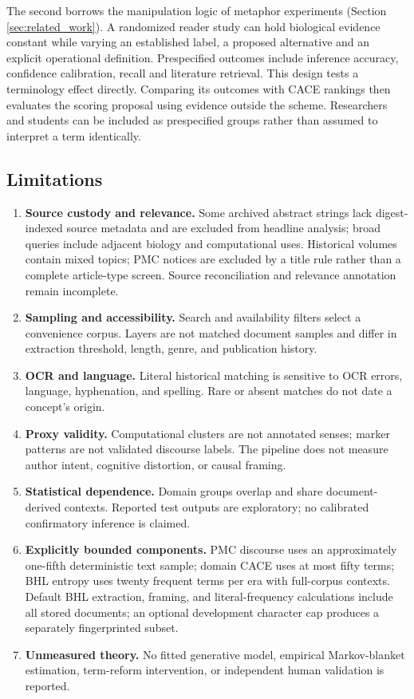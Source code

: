 \documentclass[
]{article}
\providecommand{\tightlist}{%
  \setlength{\itemsep}{0pt}\setlength{\parskip}{0pt}}
\numberwithin{equation}{section}
\begin{document}
The second borrows the manipulation logic of metaphor experiments
(Section \ref{sec:related_work}). A randomized reader study can hold
biological evidence constant while varying an established label, a
proposed alternative and an explicit operational definition.
Prespecified outcomes include inference accuracy, confidence
calibration, recall and literature retrieval. This design tests a
terminology effect directly. Comparing its outcomes with CACE rankings
then evaluates the scoring proposal using evidence outside the scheme.
Researchers and students can be included as prespecified groups rather
than assumed to interpret a term identically.

\subsection{Limitations}\label{limitations}

\begin{enumerate}
\def\labelenumi{\arabic{enumi}.}
\tightlist
\item
  \textbf{Source custody and relevance.} Some archived abstract strings
  lack digest-indexed source metadata and are excluded from headline
  analysis; broad queries include adjacent biology and computational
  uses. Historical volumes contain mixed topics; PMC notices are
  excluded by a title rule rather than a complete article-type screen.
  Source reconciliation and relevance annotation remain incomplete.
\item
  \textbf{Sampling and accessibility.} Search and availability filters
  select a convenience corpus. Layers are not matched document samples
  and differ in extraction threshold, length, genre, and publication
  history.
\item
  \textbf{OCR and language.} Literal historical matching is sensitive to
  OCR errors, language, hyphenation, and spelling. Rare or absent
  matches do not date a concept's origin.
\item
  \textbf{Proxy validity.} Computational clusters are not annotated
  senses; marker patterns are not validated discourse labels. The
  pipeline does not measure author intent, cognitive distortion, or
  causal framing.
\item
  \textbf{Statistical dependence.} Domain groups overlap and share
  document-derived contexts. Reported test outputs are exploratory; no
  calibrated confirmatory inference is claimed.
\item
  \textbf{Explicitly bounded components.} PMC discourse uses an
  approximately one-fifth deterministic text sample; domain CACE uses at
  most fifty terms; BHL entropy uses twenty frequent terms per era with
  full-corpus contexts. Default BHL extraction, framing, and
  literal-frequency calculations include all stored documents; an
  optional development character cap produces a separately fingerprinted
  subset.
\item
  \textbf{Unmeasured theory.} No fitted generative model, empirical
  Markov-blanket estimation, term-reform intervention, or independent
  human validation is reported.
\end{enumerate}
\end{document}
